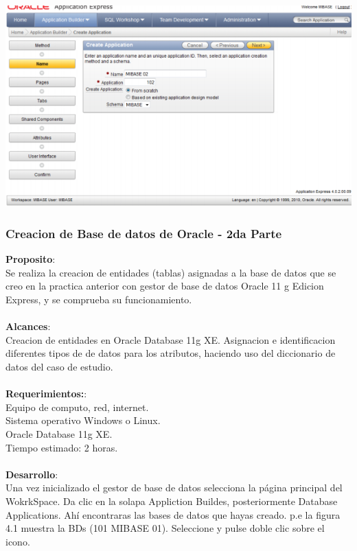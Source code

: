 \documentclass[12pt,letterpaper]{article}
\begin{document}
\begin{center}
\includegraphics[width=15cm]{./IMG/img13}
\end{center}
\subsubsection{Creacion de Base de datos de Oracle - 2da Parte}

\textbf{Proposito}:\\
Se realiza la creacion de entidades (tablas) asignadas a la base de datos que se
creo en la practica anterior con gestor de base de datos Oracle 11 g Edicion
Express, y se comprueba su funcionamiento.\\\\
\textbf{Alcances}:\\
Creacion de entidades en Oracle Database 11g XE.
Asignacion e identificacion diferentes tipos de de datos para los atributos, haciendo
uso del diccionario de datos del caso de estudio. \\\\
\textbf{Requerimientos:}:\\
Equipo de computo, red, internet.\\
Sistema operativo Windows o Linux.\\
Oracle Database 11g XE.\\
Tiempo estimado: 2 horas.\\\\
\textbf{Desarrollo}:\\
Una vez inicializado el gestor de base de datos selecciona la p\'agina principal del
WokrkSpace. Da clic en la solapa Appliction Buildes, posteriormente Database
Applications. Ah\'i encontraras las bases de datos que hayas creado. p.e la figura
4.1 muestra la BDs (101 MIBASE 01). Seleccione y pulse doble clic sobre el
icono.\\
\end{document}
